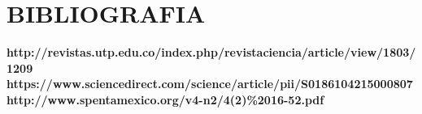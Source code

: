 \section{BIBLIOGRAFIA} 
\begin{flushleft}
\textbf {http://revistas.utp.edu.co/index.php/revistaciencia/article/view/1803/1209}\\

\textbf{https://www.sciencedirect.com/science/article/pii/S0186104215000807}\\

\textbf{http://www.spentamexico.org/v4-n2/4(2)\%2016-52.pdf}\\

\textbf{}\\

\end{flushleft}